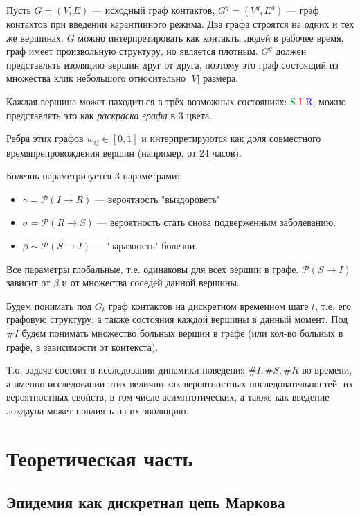 	Пусть $ G = (V, E) $ --- исходный граф контактов, $ G^q = (V^q, E^q) $ --- граф контактов при введении карантинного режима. Два графа строятся на одних и тех же вершинах. $ G $ можно интерпретировать как контакты людей в рабочее время, граф имеет произвольную структуру, но является плотным. $G^q$ должен представлять изоляцию вершин друг от друга, поэтому это граф состоящий из множества клик небольшого относительно $\lvert V \rvert$ размера.
	
	Каждая вершина может находиться в трёх возможных состояниях: \textcolor{green}{S} \textcolor{red}{I} \textcolor{blue}{R}, можно представлять это как \textit{раскраска графа} в 3 цвета. 
	
	Ребра этих графов $w_{ij} \in [0, 1]$ и интерпретируются как доля совместного времяпрепровождения вершин (например, от 24 часов).
	
	Болезнь параметризуется 3 параметрами:
	
	\begin{itemize}
		\item $\gamma = \mathcal{P}(I \rightarrow R)$ --- вероятность "выздороветь"
		\item $\sigma = \mathcal{P}(R \rightarrow S)$ --- вероятность стать снова подверженным заболеванию.
		\item $\beta \sim \mathcal{P}(S \rightarrow I)$ --- "заразность" болезни.
	\end{itemize}

	Все параметры глобальные, т.е. одинаковы для всех вершин в графе. $\mathcal{P}(S \rightarrow I)$ зависит от $\beta$ и от множества соседей данной вершины.
	
	Будем понимать под $ G_t $ граф контактов на дискретном временном шаге $ t $, т.е. его графовую структуру, а также состояния каждой вершины в данный момент. Под $ \# I $ будем понимать множество больных вершин в графе (или кол-во больных в графе, в зависимости от контекста). 
	
	Т.о. задача состоит в исследовании динамики поведения $ \# I, \# S, \# R $ во времени, а именно исследовании этих величин как вероятностных последовательностей, их вероятностных свойств, в том числе асимптотических, а также как введение локдауна может повлиять на их эволюцию.
	
	\section*{Теоретическая часть}
	
	\subsection*{Эпидемия как дискретная цепь Маркова}
	

